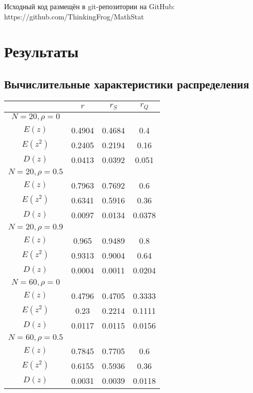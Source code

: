 \documentclass[12pt,a4paper]{article}
\begin{document}
Исходный код размещён в git-репозитории на GitHub: \\ https://github.com/ThinkingFrog/MathStat

\section {Результаты}
\subsection{Вычислительные характеристики распределения}
\begin{table}[H]
    \centering
    \begin{tabular}{|c|c|c|c|}
        \hline
        & $r$ & $r_S$ & $r_Q$\\\hline
        $N = 20, \rho = 0$ & & &\\\hline
        $E(z)$ & 0.4904 & 0.4684 & 0.4\\\hline
        $E(z^2)$ & 0.2405 & 0.2194 & 0.16\\\hline
        $D(z)$ & 0.0413 & 0.0392 & 0.051\\\hline
        \hline
        $N = 20, \rho = 0.5$ & & &\\\hline
        $E(z)$ & 0.7963 & 0.7692 & 0.6\\\hline
        $E(z^2)$ & 0.6341 & 0.5916 & 0.36\\\hline
        $D(z)$ & 0.0097 & 0.0134 & 0.0378\\\hline
        \hline
        $N = 20, \rho = 0.9$ & & &\\\hline
        $E(z)$ & 0.965 & 0.9489 & 0.8\\\hline
        $E(z^2)$ & 0.9313 & 0.9004 & 0.64\\\hline
        $D(z)$ & 0.0004 & 0.0011 & 0.0204\\\hline
        \hline
        $N = 60, \rho = 0$ & & &\\\hline
        $E(z)$ & 0.4796 & 0.4705 & 0.3333\\\hline
        $E(z^2)$ & 0.23 & 0.2214 & 0.1111\\\hline
        $D(z)$ & 0.0117 & 0.0115 & 0.0156\\\hline
        \hline
        $N = 60, \rho = 0.5$ & & &\\\hline
        $E(z)$ & 0.7845 & 0.7705 & 0.6\\\hline
        $E(z^2)$ & 0.6155 & 0.5936 & 0.36\\\hline
        $D(z)$ & 0.0031 & 0.0039 & 0.0118\\\hline

\end{tabular}
\end{table}
\end{document}
